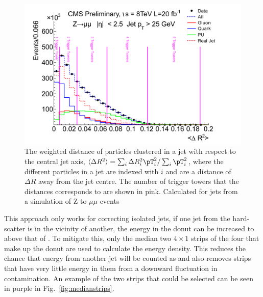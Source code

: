 \begin{figure}
	\begin{center}
		\includegraphics[width=0.8\linewidth]{figs/trigger/jetProfile}
  \caption{ The \pT weighted distance of particles clustered in a
  jet with respect to the central jet axis, $\langle \Delta R^2\rangle
  = \sum_{i} \Delta R_i^2\pT_i^2/\sum_{i} \pT_i^2$, where the
  different particles in a jet are indexed with $i$ and are a distance
  of $\Delta R$ away from the jet centre. The number of
  trigger towers that the distances corresponds to are shown in pink.
  Calculated for jets from
  a simulation of Z to $\mu\mu$ events \cite{JetProfile_pileup}}
	\label{fig:jetprofile}
	\end{center}
\end{figure}

This approach only works for correcting isolated jets, if one jet from
the hard-scatter is
in the vicinity of another, the energy in the donut can be increased to
above that of \PU. To mitigate this, only the median two $4\times1$
\TT strips of the four that make up the donut are used to calculate
the \PU energy density. This reduces the chance that energy from
another jet will be counted as \PU and also removes strips that have
very little energy in them from a downward fluctuation in \PU
contamination. An example of the two strips that could be selected can
be seen in purple in Fig.~\ref{fig:medianstrips}.

